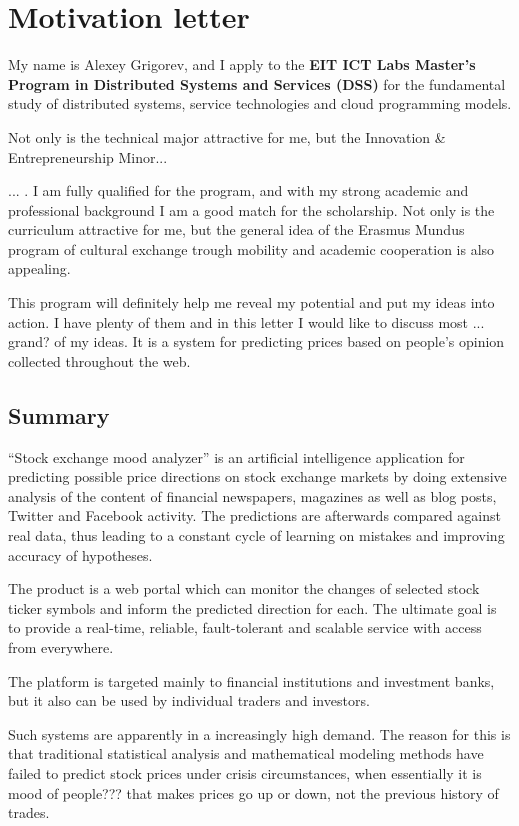 \documentclass[a4paper,12pt]{article}
\begin{document}
\section*{Motivation letter}

My name is Alexey Grigorev, and I apply to the \textbf{EIT ICT Labs Master's Program in Distributed Systems and Services (DSS)} for the fundamental study of distributed systems, service technologies and cloud programming models.

Not only is the technical major attractive for me, but the Innovation \& Entrepreneurship Minor...


... . I am fully qualified for the program, and with my strong academic and professional background I am a good match for the scholarship. Not only is the curriculum attractive for me, but the general idea of the Erasmus Mundus program of cultural exchange trough mobility and academic cooperation is also appealing.

This program will definitely help me reveal my potential and put my ideas into action. I have plenty of them and in this letter I would like to discuss most ... grand? of my ideas. It is a system for predicting prices based on people's opinion collected throughout the web.

\subsection*{Summary}

``Stock exchange mood analyzer'' is an artificial intelligence application for predicting possible price directions on stock exchange markets by doing extensive analysis of the content of financial newspapers, magazines as well as blog posts, Twitter and Facebook activity. The predictions are afterwards compared against real data, thus leading to a constant cycle of learning on mistakes and improving accuracy of hypotheses.

The product is a web portal which can monitor the changes of selected stock ticker symbols and inform the predicted direction for each. The ultimate goal is to provide a real-time, reliable, fault-tolerant and scalable service with access from everywhere.

The platform is targeted mainly to financial institutions and investment banks, but it also can be used by individual traders and investors.

Such systems are apparently in a increasingly high demand. The reason for this is that traditional statistical analysis and mathematical modeling methods have failed to predict stock prices under crisis circumstances, when essentially it is mood of people??? that makes prices go up or down, not the previous history of trades.
\end{document}
